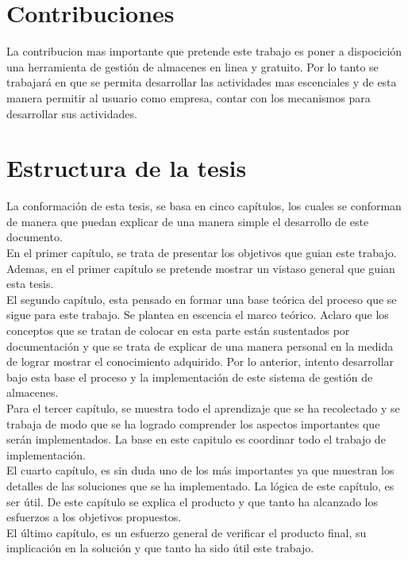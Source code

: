 
\section{Contribuciones}

La contribucion mas importante que pretende este trabajo es poner a dispocición una herramienta de gestión de almacenes en linea y gratuito. Por lo tanto se trabajará en que se permita desarrollar las actividades mas escenciales y de esta manera permitir al usuario como empresa, contar con los mecanismos para desarrollar sus actividades.\\


\section{Estructura de la tesis}

La conformación de esta tesis, se basa en cinco capítulos, los cuales se conforman de manera que puedan explicar de una manera simple el desarrollo de este documento.\\

En el primer capítulo, se trata de presentar los objetivos que guian este trabajo. Ademas, en el primer capítulo se pretende mostrar un vistaso general que guian esta tesis.\\

El segundo capítulo, esta pensado en formar una base teórica del proceso que se sigue para este trabajo. Se plantea en escencia el marco teórico. Aclaro que los conceptos que se tratan de colocar en esta parte están sustentados por documentación y que se trata de explicar de una manera personal en la medida de lograr mostrar el conocimiento adquirido. Por lo anterior, intento desarrollar bajo esta base el proceso y la implementación de este sistema de gestión de almacenes.\\

Para el tercer capítulo, se muestra todo el aprendizaje que se ha recolectado y se trabaja de modo que se ha logrado comprender los aspectos importantes que serán implementados. La base en este capitulo es coordinar todo el trabajo de implementación.\\

El cuarto capítulo, es sin duda uno de los más importantes ya que muestran los detalles de las soluciones que se ha implementado. La lógica de este capítulo, es ser útil. De este capítulo se explica el producto y que tanto ha alcanzado los esfuerzos a los objetivos propuestos.\\

El último capítulo, es un esfuerzo general de verificar el producto final, su implicación en la solución y que tanto ha sido útil este trabajo.\\
